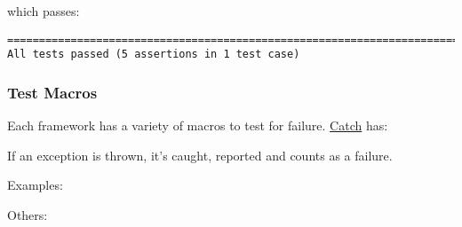 which passes:

\begin{verbatim}
===============================================================================
All tests passed (5 assertions in 1 test case)

\end{verbatim}

\hypertarget{test-macros}{%
\subsubsection{Test Macros}\label{test-macros}}

Each framework has a variety of macros to test for failure.
\href{https://github.com/philsquared/Catch}{Catch} has:

\begin{Shaded}
\begin{Highlighting}[]
\end{Highlighting}
\end{Shaded}

If an exception is thrown, it's caught, reported and counts as a
failure.

Examples:

\begin{Shaded}
\begin{Highlighting}[]
\NormalTok{ );}
\NormalTok{ );}
\end{Highlighting}
\end{Shaded}

Others:

\begin{Shaded}
\begin{Highlighting}[]
\end{Highlighting}
\end{Shaded}

